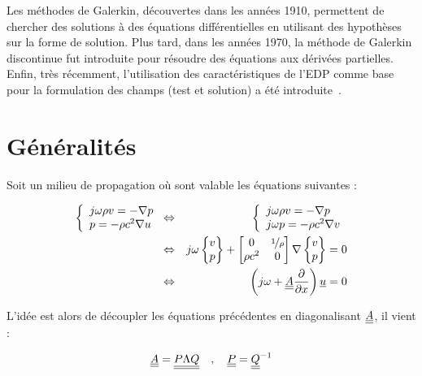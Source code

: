 Les méthodes de Galerkin, découvertes dans les années 1910, permettent de chercher des solutions à des équations
différentielles en utilisant des hypothèses sur la forme de solution. Plus tard, dans les années 1970, la méthode de
Galerkin discontinue fut introduite pour résoudre des équations aux dérivées partielles. Enfin, très récemment,
l'utilisation des caractéristiques de l'EDP comme base pour la formulation des champs (test et solution) a été
introduite~\cite{Gabard11}.

\section{Généralités}

Soit un milieu de propagation où sont valable les équations suivantes :

\begin{eqnarray}
    \left\{\begin{array}{l}
        j\omega\rho v = -\nabla p\\
        p = -\rho c^2 \nabla u
    \end{array}\right.
    & \Leftrightarrow &
    \left\{\begin{array}{l}
        j\omega\rho v = -\nabla p\\
        j\omega p = -\rho c^2 \nabla v
    \end{array}\right.
    \notag\\ & \Leftrightarrow &
    j\omega \begin{Bmatrix}v\\p\end{Bmatrix} + 
    \begin{bmatrix}
        0 & \nicefrac{1}{\rho}\\
        \rho c^2 & 0
    \end{bmatrix}
    \nabla \begin{Bmatrix}v\\p\end{Bmatrix} = 0
    \notag\\ & \Leftrightarrow &
        \left(j\omega + \underline{\underline{A}}\frac{\partial}{\partial x}\right) \underline{u} = 0 \label{dgm:eq_u}
\end{eqnarray}

L'idée est alors de découpler les équations précédentes en diagonalisant $\underline{\underline{A}}$, il vient :

\begin{equation*}
    \underline{\underline{A}} = \underline{\underline{P\Lambda Q}} \quad,\quad \underline{\underline{P}} = \underline{\underline{Q}}^{-1}
\end{equation*}

